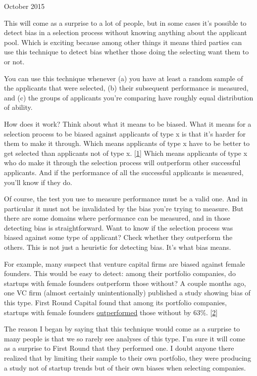 October 2015

This will come as a surprise to a lot of people, but in some cases it's
possible to detect bias in a selection process without knowing anything
about the applicant pool. Which is exciting because among other things
it means third parties can use this technique to detect bias whether
those doing the selecting want them to or not.

You can use this technique whenever (a) you have at least a random
sample of the applicants that were selected, (b) their subsequent
performance is measured, and (c) the groups of applicants you're
comparing have roughly equal distribution of ability.

How does it work? Think about what it means to be biased. What it means
for a selection process to be biased against applicants of type x is
that it's harder for them to make it through. Which means applicants of
type x have to be better to get selected than applicants not of type x.
{[}\hyperref[f1n]{1}{]} Which means applicants of type x who do make it
through the selection process will outperform other successful
applicants. And if the performance of all the successful applicants is
measured, you'll know if they do.

Of course, the test you use to measure performance must be a valid one.
And in particular it must not be invalidated by the bias you're trying
to measure. But there are some domains where performance can be
measured, and in those detecting bias is straightforward. Want to know
if the selection process was biased against some type of applicant?
Check whether they outperform the others. This is not just a heuristic
for detecting bias. It's what bias means.

For example, many suspect that venture capital firms are biased against
female founders. This would be easy to detect: among their portfolio
companies, do startups with female founders outperform those without? A
couple months ago, one VC firm (almost certainly unintentionally)
published a study showing bias of this type. First Round Capital found
that among its portfolio companies, startups with female founders
\href{http://10years.firstround.com/\#one}{outperformed} those without
by 63\%. {[}\hyperref[f2n]{2}{]}

The reason I began by saying that this technique would come as a
surprise to many people is that we so rarely see analyses of this type.
I'm sure it will come as a surprise to First Round that they performed
one. I doubt anyone there realized that by limiting their sample to
their own portfolio, they were producing a study not of startup trends
but of their own biases when selecting companies.

